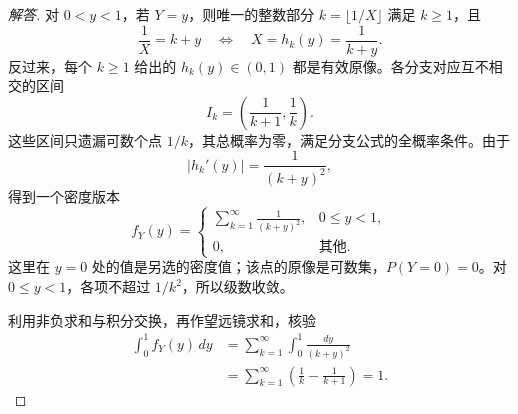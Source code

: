 \begin{proof}[解答]
对 $0<y<1$，若 $Y=y$，则唯一的整数部分 $k=\lfloor1/X\rfloor$ 满足 $k\geq1$，且
\[
\frac1X=k+y
\quad\Longleftrightarrow\quad X=h_k(y)=\frac1{k+y}.
\]
反过来，每个 $k\geq1$ 给出的 $h_k(y)\in(0,1)$ 都是有效原像。各分支对应互不相交的区间
\[
I_k=\left(\frac1{k+1},\frac1k\right).
\]
这些区间只遗漏可数个点 $1/k$，其总概率为零，满足分支公式的全概率条件。由于
\[
|h_k'(y)|=\frac1{(k+y)^2},
\]
得到一个密度版本
\[
f_Y(y)=
\begin{cases}
\displaystyle\sum_{k=1}^{\infty}\frac1{(k+y)^2},&0\leq y<1,\\
0,&\text{其他}.
\end{cases}
\]
这里在 $y=0$ 处的值是另选的密度值；该点的原像是可数集，$P(Y=0)=0$。对 $0\leq y<1$，各项不超过 $1/k^2$，所以级数收敛。

利用非负求和与积分交换，再作望远镜求和，核验
\begin{align*}
\int_0^1 f_Y(y)\,dy
&=\sum_{k=1}^{\infty}\int_0^1\frac{dy}{(k+y)^2}\\
&=\sum_{k=1}^{\infty}\left(\frac1k-\frac1{k+1}\right)
=1.
\end{align*}
\end{proof}
